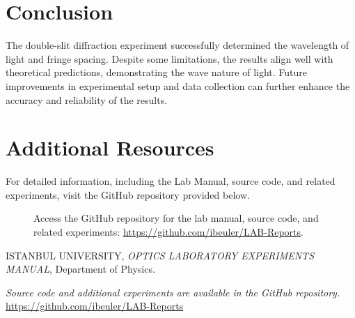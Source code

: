 \documentclass[journal]{IEEEtran}
\begin{document}
\section{Conclusion}
The double-slit diffraction experiment successfully determined the wavelength of light and fringe spacing. Despite some limitations, the results align well with theoretical predictions, demonstrating the wave nature of light. Future improvements in experimental setup and data collection can further enhance the accuracy and reliability of the results.

\section{Additional Resources}
For detailed information, including the Lab Manual, source code, and related experiments, visit the GitHub repository provided below.

\begin{figure}[H]
    \centering
    \begin{minipage}{0.15\textwidth}
        \centering
    \end{minipage}%
    \begin{minipage}{0.2\textwidth}
        \raggedright
        \caption{Access the GitHub repository for the lab manual, source code, and related experiments: \href{https://github.com/ibeuler/LAB-Reports}{\url{https://github.com/ibeuler/LAB-Reports}}.}
        \label{fig:qr_code}
    \end{minipage}
\end{figure}

\begin{thebibliography}{9}
    ISTANBUL UNIVERSITY, \textit{OPTICS LABORATORY
    EXPERIMENTS MANUAL}, Department of Physics.

    \textit{Source code and additional experiments are available in the GitHub repository.} \url{https://github.com/ibeuler/LAB-Reports}
\end{thebibliography}
\end{document}

